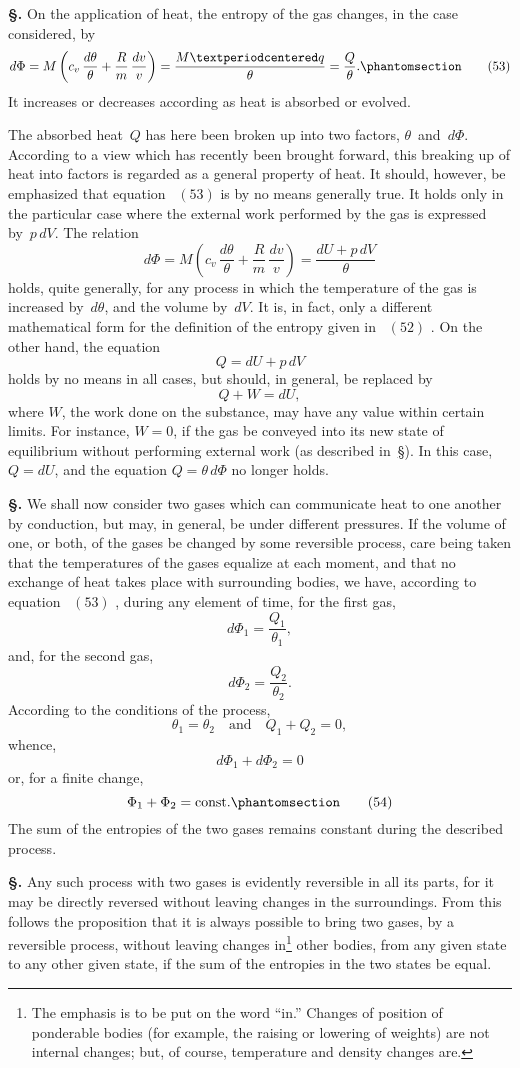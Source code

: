 \documentclass[12pt]{book}[2005/09/16]
\newcommand{\Section}[1]{
  \medskip\par\textbf{§\;#1}
  \label{section:#1}
}
\newcommand{\SecRef}[2][§\;]{\hyperref[section:#2.]{{\upshape #1#2}}}
\newcommand{\Tag}[1]{%
  \phantomsection\label{eqn:#1}\tag*{\ensuremath{#1}}%
}
\newcommand{\Eq}[1]{%
  \hyperref[eqn:#1]{\ensuremath{#1}}%
}
\newcommand{\PageSep}[1]{\ignorespaces}
\newcommand{\const}{\text{const.}}
\begin{document}
\Section{120.} On the application of heat, the entropy of the
gas changes, in the case considered, by
\[
d\Phi
  = M \left(c_{v}\, \frac{d\theta}{\theta} + \frac{R}{m}\, \frac{dv}{v}\right)
  = \frac{M · q}{\theta} = \frac{Q}{\theta}.
\Tag{(53)}
\]
It increases or decreases according as heat is absorbed or
evolved.

The absorbed heat~$Q$ has here been broken up into two
factors, $\theta$~and~$d\Phi$. According to a view which has recently
been brought forward, this breaking up of heat into factors is
regarded as a general property of heat. It should, however,
be emphasized that equation~\Eq{(53)} is by no means generally
true. It holds only in the particular case where the external
work performed by the gas is expressed by~$p\, dV$. The
relation
\[
d\Phi
  = M \left(c_{v}\, \frac{d\theta}{\theta} + \frac{R}{m}\, \frac{dv}{v}\right)
  = \frac{dU + p\, dV}{\theta}
\]
holds, quite generally, for any process in which the temperature
of the gas is increased by~$d\theta$, and the volume by~$dV$.
It is, in fact, only a different mathematical form for the
definition of the entropy given in~\Eq{(52)}. On the other
hand, the equation
\[
Q = dU + p\, dV
\]
holds by no means in all cases, but should, in general, be
replaced by
\[
Q + W = dU,
\]
\PageSep{90}
where $W$, the work done on the substance, may have any
value within certain limits. For instance, $W = 0$, if the
gas be conveyed into its new state of equilibrium without
performing external work (as described in~\SecRef{68}). In this
case, $Q = dU$, and the equation $Q = \theta\, d\Phi$ no longer holds.

\Section{121.} We shall now consider two gases which can communicate
heat to one another by conduction, but may, in
general, be under different pressures. If the volume of
one, or both, of the gases be changed by some reversible
process, care being taken that the temperatures of the gases
equalize at each moment, and that no exchange of heat
takes place with surrounding bodies, we have, according
to equation~\Eq{(53)}, during any element of time, for the first
gas,
\[
d\Phi_{1} = \frac{Q_{1}}{\theta_{1}},
\]
and, for the second gas,
\[
d\Phi_{2} = \frac{Q_{2}}{\theta_{2}}.
\]
According to the conditions of the process,
\[
\theta_{1} = \theta_{2}\quad\text{and}\quad Q_{1} + Q_{2} = 0,
\]
whence,
\[
d\Phi_{1} + d\Phi_{2} = 0
\]
or, for a finite change,
\[
\Phi_{1} + \Phi_{2} = \const
\Tag{(54)}
\]
The sum of the entropies of the two gases remains constant
during the described process.

\Section{122.} Any such process with two gases is evidently
reversible in all its parts, for it may be directly reversed
without leaving changes in the surroundings. From this
follows the proposition that it is always possible to bring
two gases, by a reversible process, without leaving changes
\PageSep{91}
%
in\footnote
  {The emphasis is to be put on the word ``in.'' Changes of position of
  ponderable bodies (for example, the raising or lowering of weights) are not
  internal changes; but, of course, temperature and density changes are.}
other bodies, from any given state to any other given
state, if the sum of the entropies in the two states be equal.
\end{document}
